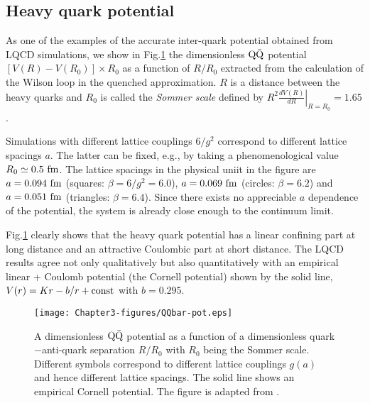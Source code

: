  
 
\subsection{Heavy quark potential}

 As one of the examples of the accurate  inter-quark potential obtained from LQCD simulations,
 we  show in Fig.\ref{fig:QQbar-pot}  the  
 dimensionless ${\rm Q}\bar{\rm Q}$ potential 
$[V(R)-V(R_0)]\times R_0$
 as a function of $R/R_0$ extracted from the calculation of the   
   Wilson loop in the quenched approximation.
 $R$ is a distance between the heavy quarks
  and $R_0$ is called the {\it Sommer scale}   defined by
 $  \left. R^2 \frac{dV(R)}{dR} \right|_{R=R_0}=1.65$.
 
 Simulations with different lattice couplings $6/g^2$
  correspond to different lattice spacings $a$.
 The latter can be fixed, e.g., by   
 taking a phenomenological value
  $R_0\simeq 0.5\ {\rm fm}$. 
    The lattice spacings in the physical uniit in the figure are
   $a=0.094\ {\rm fm}$ (squares: $\beta=6/g^2=6.0$),
    $a= 0.069\ {\rm fm}$ (circles: $\beta=6.2$)
  and  $a=0.051\ {\rm fm}$ (triangles: $\beta=6.4$).
  Since there exists no appreciable $a$ dependence of the potential,
 the system is already close enough to the continuum limit. 
  
 Fig.\ref{fig:QQbar-pot} clearly shows that the 
  heavy quark potential has a linear confining part
   at long distance and an attractive Coulombic part 
    at short distance. The LQCD results agree
     not only qualitatively but also quantitatively  
  with an empirical linear + Coulomb potential
  (the Cornell potential)    shown by the solid line,
   $V(r) = Kr - b/r + {\rm const}$ with $b=0.295$.  
   
\begin{figure}[t]
\begin{center}
\texttt{[image: Chapter3-figures/QQbar-pot.eps]} 
 \end{center}
\caption{A dimensionless ${\rm Q}\bar{\rm Q}$ potential as a 
 function of a dimensionless quark$-$anti-quark
 separation $R/R_0$ with $R_0$ being the Sommer scale. 
 Different  symbols correspond to different lattice couplings
  $g(a)$    and hence different lattice spacings. 
  The solid line shows an empirical Cornell potential. 
  The figure is adapted from \cite{Bali:2000gf}.
  }
\label{fig:QQbar-pot}
\end{figure}


